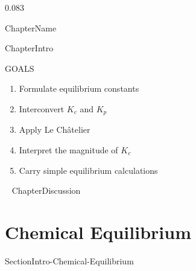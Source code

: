 0.083\documentclass[main.tex]{subfiles}
\begin{document}
  
   {ChapterName}


      \begin{marginfigure}
\end{marginfigure}
   {ChapterIntro}




\begin{marginfigure}%
\begin{mytcbox}{GOALS}
\begin{enumerate}[label=\protect\circled{\color{white}\arabic*}]
\item Formulate equilibrium constants
\item Interconvert $K_c$ and $K_p$
\item Apply Le Ch\^{a}telier
\item Interpret the magnitude of $K_c$
\item Carry simple equilibrium calculations
\end{enumerate}
\end{mytcbox}
\vspace{1cm}
\begin{tcolorbox}[enhanced,colback=red!5!white,colframe=black!50!red,boxrule=1pt,
  arc=0pt,outer arc=0pt,drop heavy lifted shadow]
\faGears\ 
  {ChapterDiscussion}


\end{tcolorbox}
\end{marginfigure}%

\section{Chemical Equilibrium} {SectionIntro-Chemical-Equilibrium}
\end{document}
